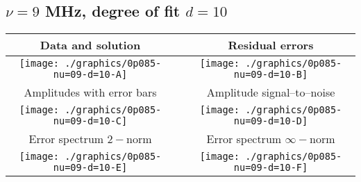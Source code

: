 

% 

\clearpage{}
\break{}

\subsection{$\nu = 9$ MHz, degree of fit $d = 10$}

\begin{table}[h]
    \begin{center}
        \begin{tabular}{ccc}
            Data and solution & \quad & Residual errors \\\hline
            \texttt{[image: ./graphics/0p085-nu=09-d=10-A]} &&
            \texttt{[image: ./graphics/0p085-nu=09-d=10-B]} \\[15pt]
            Amplitudes with error bars && Amplitude signal--to--noise \\\hline
            \texttt{[image: ./graphics/0p085-nu=09-d=10-C]} &&
            \texttt{[image: ./graphics/0p085-nu=09-d=10-D]} \\[15pt]
            Error spectrum $2-$norm && Error spectrum $\infty-$norm \\\hline
            \texttt{[image: ./graphics/0p085-nu=09-d=10-E]} &&
            \texttt{[image: ./graphics/0p085-nu=09-d=10-F]} \\[15pt]
        \end{tabular}
    \end{center}
\label{fig:elev=85, nu=9}
\end{table}



\endinput

